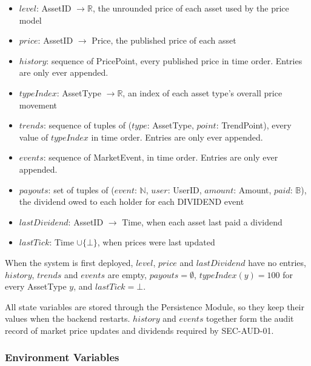 \documentclass[12pt, titlepage]{article}
\begin{document}
\begin{itemize}
\item $\mathit{level}$: AssetID $\rightarrow \mathbb{R}$, the unrounded price
  of each asset used by the price model
\item $\mathit{price}$: AssetID $\rightarrow$ Price, the published price of
  each asset
\item $\mathit{history}$: sequence of PricePoint, every published price in
  time order. Entries are only ever appended.
\item $\mathit{typeIndex}$: AssetType $\rightarrow \mathbb{R}$, an index of
  each asset type's overall price movement
\item $\mathit{trends}$: sequence of tuples of ($\mathit{type}$: AssetType,
  $\mathit{point}$: TrendPoint), every value of $\mathit{typeIndex}$ in time
  order. Entries are only ever appended.
\item $\mathit{events}$: sequence of MarketEvent, in time order. Entries are
  only ever appended.
\item $\mathit{payouts}$: set of tuples of ($\mathit{event}$: $\mathbb{N}$,
  $\mathit{user}$: UserID, $\mathit{amount}$: Amount, $\mathit{paid}$:
  $\mathbb{B}$), the dividend owed to each holder for each DIVIDEND event
\item $\mathit{lastDividend}$: AssetID $\rightarrow$ Time, when each asset
  last paid a dividend
\item $\mathit{lastTick}$: Time $\cup \{\bot\}$, when prices were last
  updated
\end{itemize}

\noindent When the system is first deployed, $\mathit{level}$,
$\mathit{price}$ and $\mathit{lastDividend}$ have no entries,
$\mathit{history}$, $\mathit{trends}$ and $\mathit{events}$ are empty,
$\mathit{payouts} = \emptyset$, $\mathit{typeIndex}(y) = 100$ for every
AssetType $y$, and $\mathit{lastTick} = \bot$.

\noindent All state variables are stored through the Persistence Module, so
they keep their values when the backend restarts.
$\mathit{history}$ and $\mathit{events}$ together form the audit record of
market price updates and dividends required by SEC-AUD-01.

\subsubsection{Environment Variables}
\end{document}
